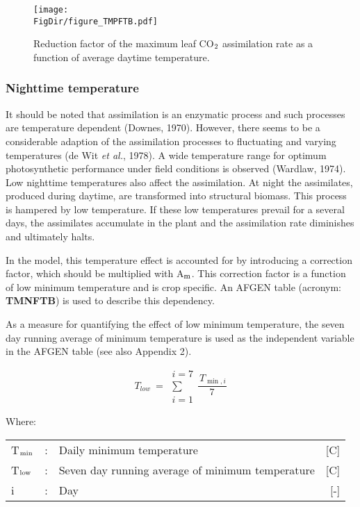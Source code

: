 \begin{figure}[p]
	\centering
	\texttt{[image: \\FigDir/figure\_TMPFTB.pdf]}
	\caption{Reduction factor of the maximum leaf CO$_{{\rm 2}}$ assimilation rate as a function of
		average daytime temperature.}
	\label{fig:TMPFTB}
\end{figure}

\subsubsection{Nighttime temperature}
It should be noted that assimilation is an enzymatic process and such processes are
temperature dependent (Downes, 1970). However, there seems to be a considerable
adaption of the assimilation processes to fluctuating and varying temperatures (de Wit {\it et al.}, 1978). 
A wide temperature range for optimum photosynthetic performance under field
conditions is observed (Wardlaw, 1974). Low nighttime temperatures also affect the
assimilation. At night the assimilates, produced during daytime, are transformed into
structural biomass. This process is hampered by low temperature. If these low temperatures prevail 
for a several days, the assimilates accumulate in the plant and the assimilation rate diminishes 
and ultimately halts.

In the model, this temperature effect is accounted for by introducing a correction factor,
which should be multiplied with A$_{{\rm m}}$. This correction factor is a function of low minimum
temperature and is crop specific. An AFGEN table (acronym: {\bf TMNFTB}) is used to
describe this dependency.

As a measure for quantifying the effect of low minimum temperature, the seven day
running average of minimum temperature is used as the independent variable in the
AFGEN table (see also Appendix 2).

\begin{equation}
T _{low} ~=~\begin{array}{c}{i=7}  \\
\sum  \\
{i=1}\end{array}{\frac{\, T _{\min ,i} }{7}}
\end{equation}

Where:\\[5pt]
\begin{tabularx}{\textwidth}{llXr}
	T$_{{\rm min}}$  &:& Daily minimum temperature   &     [\degrees C]\\
	T$_{{\rm low}}$ &:& Seven day running average of minimum temperature    &    [\degrees C]\\
	i &:& Day    &    [-]
\end{tabularx}


